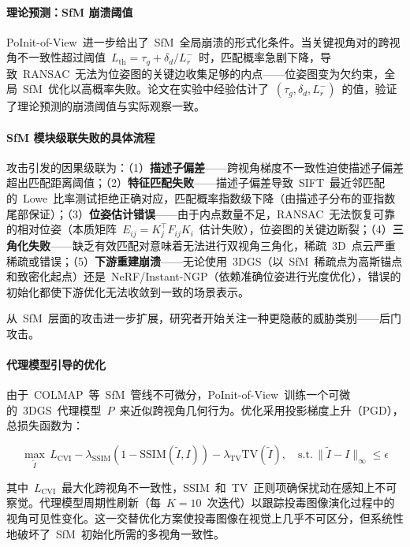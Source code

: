 \paragraph{理论预测：SfM 崩溃阈值}

PoInit-of-View~进一步给出了~SfM~全局崩溃的形式化条件。当关键视角对的跨视角不一致性超过阈值~$L_{\text{th}} = \tau_g + \delta_d / L_r^{-}$~时，匹配概率急剧下降，导致~RANSAC~无法为位姿图的关键边收集足够的内点——位姿图变为欠约束，全局~SfM~优化以高概率失败。论文在实验中经验估计了~$(\tau_g, \delta_d, L_r^{-})$~的值，验证了理论预测的崩溃阈值与实际观察一致。

\paragraph{SfM 模块级联失败的具体流程}

攻击引发的因果级联为：（1）\textbf{描述子偏差}——跨视角梯度不一致性迫使描述子偏差超出匹配距离阈值；（2）\textbf{特征匹配失败}——描述子偏差导致~SIFT~最近邻匹配的~Lowe~比率测试拒绝正确对应，匹配概率指数级下降（由描述子分布的亚指数尾部保证）；（3）\textbf{位姿估计错误}——由于内点数量不足，RANSAC~无法恢复可靠的相对位姿（本质矩阵~$E_{ij} = K_j^\top F_{ij} K_i$~估计失败），位姿图的关键边断裂；（4）\textbf{三角化失败}——缺乏有效匹配对意味着无法进行双视角三角化，稀疏~3D~点云严重稀疏或错误；（5）\textbf{下游重建崩溃}——无论使用~3DGS（以~SfM~稀疏点为高斯锚点和致密化起点）还是~NeRF/Instant-NGP（依赖准确位姿进行光度优化），错误的初始化都使下游优化无法收敛到一致的场景表示。

从~SfM~层面的攻击进一步扩展，研究者开始关注一种更隐蔽的威胁类别——后门攻击。

\paragraph{代理模型引导的优化}

由于~COLMAP~等~SfM~管线不可微分，PoInit-of-View~训练一个可微的~3DGS~代理模型~$P$~来近似跨视角几何行为。优化采用投影梯度上升（PGD），总损失函数为：

\begin{equation}
\max_{\tilde{I}} \, L_{\text{CVI}} - \lambda_{\text{SSIM}}(1-\text{SSIM}(\tilde{I}, I)) - \lambda_{\text{TV}} \text{TV}(\tilde{I}), \quad \text{s.t.} \, \|\tilde{I} - I\|_\infty \leq \epsilon
\end{equation}

其中~$L_{\text{CVI}}$~最大化跨视角不一致性，SSIM~和~TV~正则项确保扰动在感知上不可察觉。代理模型周期性刷新（每~$K=10$~次迭代）以跟踪投毒图像演化过程中的视角可见性变化。这一交替优化方案使投毒图像在视觉上几乎不可区分，但系统性地破坏了~SfM~初始化所需的多视角一致性。

